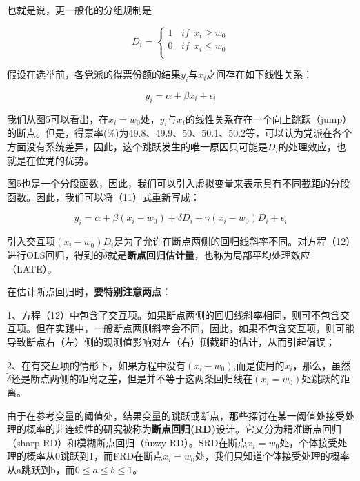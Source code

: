 \documentclass[cn,10pt,math=newtx,citestyle=gb7714-2015,bibstyle=gb7714-2015]{elegantbook}
\begin{document}
	也就是说，更一般化的分组规制是
	
	\begin{equation}
		D_i= \left\{
		\begin{aligned}
			1~~~~if ~~x_i\geq{w_0}  \\
			0~~~~if ~~x_i\le{w_0} \\
		\end{aligned}
		\right.
	\end{equation}
	
	假设在选举前，各党派的得票份额的结果$y_i$与$x_i$之间存在如下线性关系：
	
	\begin{equation}
		y_i=\alpha+\beta{x_i}+\epsilon_i
	\end{equation}
	
	我们从图5可以看出，在$x_i=w_0$处，$y_i$与$x_i$的线性关系存在一个向上跳跃（jump）的断点。但是，得票率(\%)为49.8、49.9、50、50.1、50.2等，可以认为党派在各个方面没有系统差异，因此，这个跳跃发生的唯一原因只可能是$D_i$的处理效应，也就是在位党的优势。
	
	图5也是一个分段函数，因此，我们可以引入虚拟变量来表示具有不同截距的分段函数。因此，我们可以将（11）式重新写成：
	
	\begin{equation}
		y_i=\alpha+\beta{(x_i-w_0)}+\delta{D_i}+\gamma{(x_i-w_0)D_i}+\epsilon_i
	\end{equation}
	
	引入交互项$(x_i-w_0)D_i$是为了允许在断点两侧的回归线斜率不同。对方程（12）进行OLS回归，得到的$\tilde{\delta}$就是\textbf{断点回归估计量}，也称为局部平均处理效应（LATE）。
	
	在估计断点回归时，\textbf{要特别注意两点}：
	
	1、方程（12）中包含了交互项。如果断点两侧的回归线斜率相同，则可不包含交互项。但在实践中，一般断点两侧斜率会不同，因此，如果不包含交互项，则可能导致断点右（左）侧的观测值影响对左（右）侧截距的估计，从而引起偏误；
	
	2、在有交互项的情形下，如果方程中没有$(x_i-w_0)$,而是使用的$x_i$，那么，虽然$\tilde{\delta}$还是断点两侧的距离之差，但是并不等于这两条回归线在$(x_i=w_0)$处跳跃的距离。
	
	由于在参考变量的阈值处，结果变量的跳跃或断点，那些探讨在某一阈值处接受处理的概率的非连续性的研究被称为\textbf{断点回归(RD)}设计。它又分为精准断点回归（sharp RD）和模糊断点回归（fuzzy RD）。SRD在断点$x_i=w_0$处，个体接受处理的概率从0跳跃到1，而FRD在断点$x_i=w_0$处，我们只知道个体接受处理的概率从a跳跃到b，而$0\le{a}\le{b}\le{1}$。
	
\end{document}

